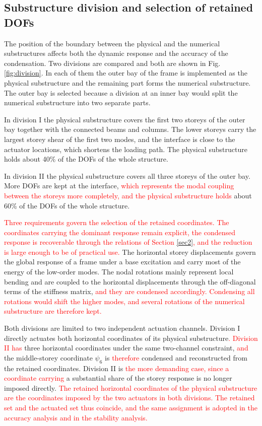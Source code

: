 \documentclass[11pt,a4paper]{article}
\numberwithin{equation}{section}
\newcommand{\rev}[1]{\textcolor{red}{#1}}
\begin{document}
\subsection{Substructure division and selection of retained DOFs}
\label{sec:division}

The position of the boundary between the physical and the numerical substructures affects both the dynamic response and the accuracy of the condensation. Two divisions are compared and both are shown in Fig. \ref{fig:division}. In each of them the outer bay of the frame is implemented as the physical substructure and the remaining part forms the numerical substructure. The outer bay is selected because a division at an inner bay would split the numerical substructure into two separate parts.

In division I the physical substructure covers the first two storeys of the outer bay together with the connected beams and columns. The lower storeys carry the largest storey shear of the first two modes, and the interface is close to the actuator locations, which shortens the loading path. The physical substructure holds about 40\% of the DOFs of the whole structure.

In division II the physical substructure covers all three storeys of the outer bay. More DOFs are kept at the interface, \rev{which represents the modal coupling between the storeys more completely, and the physical substructure holds} about 60\% of the DOFs of the whole structure.

\rev{Three requirements govern the selection of the retained coordinates. The coordinates carrying the dominant response remain explicit, the condensed response is recoverable through the relations of Section \ref{sec2}, and the reduction is large enough to be of practical use.} The horizontal storey displacements govern the global response of a frame under a base excitation and carry most of the energy of the low-order modes. The nodal rotations mainly represent local bending and are coupled to the horizontal displacements through the off-diagonal terms of the stiffness matrix, \rev{and they are condensed accordingly. Condensing all rotations would shift the higher modes, and several rotations of the numerical substructure are therefore kept.}

Both divisions are limited to two independent actuation channels. Division I directly actuates both horizontal coordinates of its physical substructure\rev{. Division II has} three horizontal coordinates under the same two-channel constraint, \rev{and} the middle-storey coordinate \(\psi_{6}\) is \rev{therefore} condensed and reconstructed from the retained coordinates. Division II is \rev{the more demanding case, since a coordinate carrying} a substantial share of the storey response is no longer imposed directly. \rev{The retained horizontal coordinates of the physical substructure are the coordinates imposed by the two actuators in both divisions. The retained set and the actuated set thus coincide, and the same assignment is adopted in the accuracy analysis and in the stability analysis.}
\end{document}
